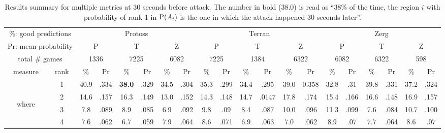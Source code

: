 \setlength{\tabcolsep}{4.69pt}
\begin{table}[ht]
\caption{Results summary for multiple metrics at 30 seconds before attack. The number in bold (38.0) is read as ``38\% of the time, the region $i$ with probability of rank 1 in $\mathrm{P}(A_i)$ is the one in which the attack happened 30 seconds later''.}
\begin{center}
\begin{footnotesize}
\begin{tabular}{|cc|cc|cc|cc|cc|cc|cc|cc|cc|cc|}
\hline
\multicolumn{2}{|c|}{\%: good predictions} & \multicolumn{6}{||c|}{Protoss} & \multicolumn{6}{|c|}{Terran} & \multicolumn{6}{|c|}{Zerg} \\
\multicolumn{2}{|c|}{Pr: mean probability} & \multicolumn{2}{||c|}{P} & \multicolumn{2}{|c|}{T} & \multicolumn{2}{|c|}{Z} & \multicolumn{2}{|c|}{P} & \multicolumn{2}{|c|}{T} & \multicolumn{2}{|c|}{Z} & \multicolumn{2}{|c|}{P} & \multicolumn{2}{|c|}{T} & \multicolumn{2}{|c|}{Z} \\
\hline
\multicolumn{2}{|c|}{total \# games} & \multicolumn{2}{|c|}{1336} & \multicolumn{2}{|c|}{7225}& \multicolumn{2}{|c|}{6082}& \multicolumn{2}{|c|}{7225}& \multicolumn{2}{|c|}{1384}& \multicolumn{2}{|c|}{6322}& \multicolumn{2}{|c|}{6082}& \multicolumn{2}{|c|}{6322}& \multicolumn{2}{|c|}{598}\\
\hline
measure & rank & \% & Pr & \% & Pr & \% & Pr & \% & Pr & \% & Pr& \% & Pr& \% & Pr& \% & Pr& \% & Pr  \\
\hline
 & 1 & 40.9 & .334 & \textbf{38.0} & .329 & 34.5 & .304 & 35.3 & .299 & 34.4 & .295 & 39.0 & 0.358 & 32.8 & .31 & 39.8 & .331 & 37.2 & .324 \\
\multirow{3}{3mm}{\begin{sideways}\parbox{3mm}{\begin{small}where\end{small}}\end{sideways}}
 & 2 & 14.6 & .157 & 16.3 & .149 & 13.0 & .152 & 14.3 & .148 & 14.7 & .0147 & 17.8 & .174 & 15.4 & .166 & 16.6 & .148 & 16.9 & .157 \\
 & 3 & 7.8 & .089 & 8.9 & .085 & 6.9 & .092 & 9.8 & .09 & 8.4 & .087 & 10.0 & .096 & 11.3 & .099 & 7.6 & .084 & 10.7 & .100 \\
 & 4 & 7.6 & .062 & 6.7 & .059 & 7.9 & .064 & 8.6 & .071 & 6.9 & .063 & 7.0 & .062 & 8.9 & .07 & 7.7 & .064 & 8.6 & .07 \\

\end{tabular}
\end{footnotesize}
\end{center}
\end{table}
